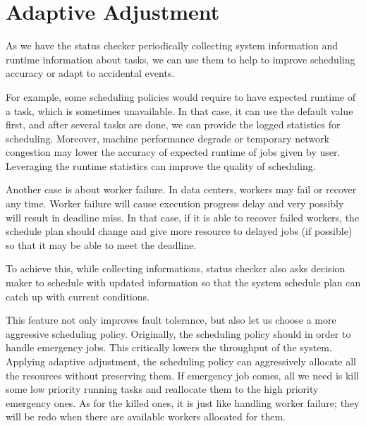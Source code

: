 \section{Adaptive Adjustment}

As we have the status checker periodically collecting system information
and runtime information about tasks, we can use them to help to improve
scheduling accuracy or adapt to accidental events.

For example, some scheduling policies would require to have expected
runtime of a task, which is sometimes unavailable.
In that case, it can use the default value first, and after several
tasks are done, we can provide the logged statistics for scheduling.
Moreover, machine performance degrade or temporary network congestion
may lower the accuracy of expected runtime of jobs given by user.
Leveraging the runtime statistics can improve the quality of
scheduling.

Another case is about worker failure.
In data centers, workers may fail or recover any time.
Worker failure will cause execution progress delay and very possibly
will result in deadline miss.
In that case, if it is able to recover failed workers, the schedule plan
should change and give more resource to delayed jobs (if possible) so
that it may be able to meet the deadline.

To achieve this, while collecting informations, status checker also
asks decision maker to schedule with updated information so that the
system schedule plan can catch up with current conditions.

This feature not only improves fault tolerance, but also let us choose a
more aggressive scheduling policy.
Originally, the scheduling policy should in order to handle emergency
jobs.
This critically lowers the throughput of the system.
Applying adaptive adjustment, the scheduling policy can aggressively
allocate all the resources without preserving them.
If emergency job comes, all we need is kill some low priority running
tasks and reallocate them to the high priority emergency ones.
As for the killed ones, it is just like handling worker failure; they
will be redo when there are available workers allocated for them.


